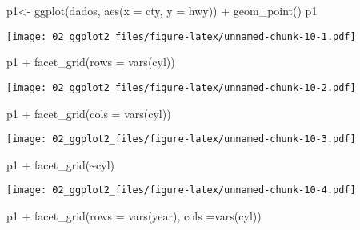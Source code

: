 \documentclass[
]{book}
\newenvironment{Shaded}{\begin{snugshade}}{\end{snugshade}}
\newcommand{\AttributeTok}[1]{\textcolor[rgb]{0.77,0.63,0.00}{#1}}
\newcommand{\FunctionTok}[1]{\textcolor[rgb]{0.00,0.00,0.00}{#1}}
\newcommand{\NormalTok}[1]{#1}
\newcommand{\OtherTok}[1]{\textcolor[rgb]{0.56,0.35,0.01}{#1}}
\newcommand{\SpecialCharTok}[1]{\textcolor[rgb]{0.00,0.00,0.00}{#1}}
\begin{document}
\begin{Shaded}
\begin{Highlighting}[]
\NormalTok{p1}\OtherTok{\textless{}{-}} \FunctionTok{ggplot}\NormalTok{(dados, }\FunctionTok{aes}\NormalTok{(}\AttributeTok{x =}\NormalTok{ cty, }\AttributeTok{y =}\NormalTok{ hwy)) }\SpecialCharTok{+}
  \FunctionTok{geom\_point}\NormalTok{()}
\NormalTok{p1}
\end{Highlighting}
\end{Shaded}

\texttt{[image: 02\_ggplot2\_files/figure-latex/unnamed-chunk-10-1.pdf]}

\begin{Shaded}
\begin{Highlighting}[]
\NormalTok{p1 }\SpecialCharTok{+} \FunctionTok{facet\_grid}\NormalTok{(}\AttributeTok{rows =} \FunctionTok{vars}\NormalTok{(cyl))}
\end{Highlighting}
\end{Shaded}

\texttt{[image: 02\_ggplot2\_files/figure-latex/unnamed-chunk-10-2.pdf]}

\begin{Shaded}
\begin{Highlighting}[]
\NormalTok{p1 }\SpecialCharTok{+} \FunctionTok{facet\_grid}\NormalTok{(}\AttributeTok{cols =} \FunctionTok{vars}\NormalTok{(cyl))}
\end{Highlighting}
\end{Shaded}

\texttt{[image: 02\_ggplot2\_files/figure-latex/unnamed-chunk-10-3.pdf]}

\begin{Shaded}
\begin{Highlighting}[]
\NormalTok{p1 }\SpecialCharTok{+} \FunctionTok{facet\_grid}\NormalTok{(}\SpecialCharTok{\textasciitilde{}}\NormalTok{cyl)}
\end{Highlighting}
\end{Shaded}

\texttt{[image: 02\_ggplot2\_files/figure-latex/unnamed-chunk-10-4.pdf]}

\begin{Shaded}
\begin{Highlighting}[]
\NormalTok{p1 }\SpecialCharTok{+} \FunctionTok{facet\_grid}\NormalTok{(}\AttributeTok{rows =} \FunctionTok{vars}\NormalTok{(year), }\AttributeTok{cols =}\FunctionTok{vars}\NormalTok{(cyl))}
\end{Highlighting}
\end{Shaded}
\end{document}

